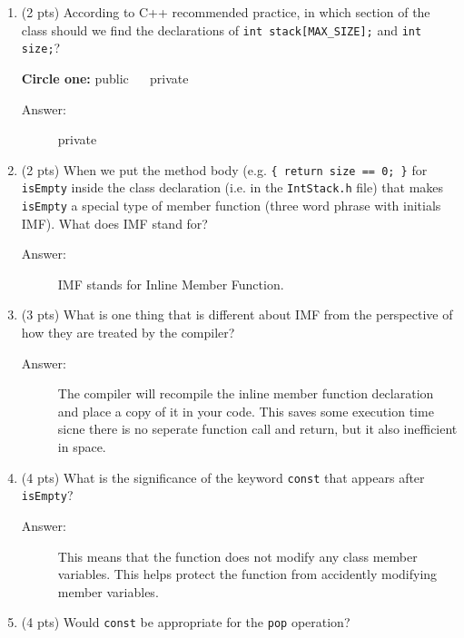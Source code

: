 \documentclass[11pt]{article}
\begin{document}
\begin{enumerate}
\item (2 pts) According to C++ recommended practice, in which
section of the class should we find the declarations of
\texttt{int stack[MAX\_SIZE];} and \texttt{int size;}?

\textbf{Circle one:} public \(\quad\) private

\begin{description}
  \item[Answer:] private
\end{description}

\item (2 pts) When we put the method body (e.g. \texttt{\{ return size ==
     0; \}} for \texttt{isEmpty} inside the class declaration (i.e. in
the \texttt{IntStack.h} file) that makes \texttt{isEmpty} a special type
of member function (three word phrase with initials
IMF). What does IMF stand for?

\begin{description}
  \item[Answer:] IMF stands for Inline Member Function.
\end{description}

\vspace{4em}
\item (3 pts) What is one thing that is different about IMF from
the perspective of how they are treated by the compiler?

\begin{description}
  \item[Answer:] The compiler will recompile the inline member function declaration and place a copy of it in your code. This saves some execution time sicne there is no seperate function call and return, but it also inefficient in space.
\end{description}

\vspace{4em}
\item (4 pts) What is the significance of the keyword \texttt{const}
that appears after \texttt{isEmpty}?

\begin{description}
  \item[Answer:] This means that the function does not modify any class member variables. This helps protect the function from accidently modifying member variables.
\end{description}

\vspace{4em}
\item (4 pts) Would \texttt{const} be appropriate for the \texttt{pop} operation?


\end{enumerate}
\end{document}
